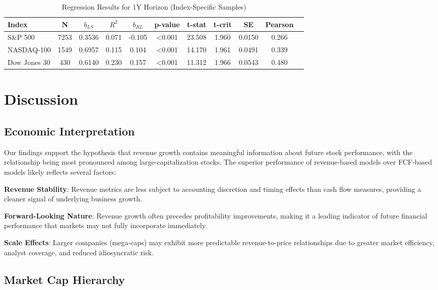 \documentclass[11pt]{article}
\begin{document}
\begin{table*}[h]
\centering
\caption{Regression Results for 1Y Horizon (Index-Specific Samples)}
\label{tab:regression-1y-index}
\small
\begin{tabular}{lcccccccccc}
\toprule
Index & N & $b_{LS}$ & $R^2$ & $b_{RL}$ & p-value & t-stat & t-crit & SE & Pearson \\
\midrule
S\&P 500     & 7253 & 0.3536 & 0.071 & -0.105 & <0.001 & 23.508 & 1.960 & 0.0150 & 0.266 \\
NASDAQ-100   & 1549 & 0.6957 & 0.115 &  0.104 & <0.001  & 14.170 & 1.961 & 0.0491 & 0.339 \\
Dow Jones 30 &  430 & 0.6140 & 0.230 &  0.157 & <0.001 & 11.312 & 1.966 & 0.0543 & 0.480 \\
\bottomrule
\end{tabular}
\end{table*}


\section{Discussion}

\subsection{Economic Interpretation}

Our findings support the hypothesis that revenue growth contains meaningful information about future stock performance, with the relationship being most pronounced among large-capitalization stocks. The superior performance of revenue-based models over FCF-based models likely reflects several factors:

\textbf{Revenue Stability}: Revenue metrics are less subject to accounting discretion and timing effects than cash flow measures, providing a cleaner signal of underlying business growth.

\textbf{Forward-Looking Nature}: Revenue growth often precedes profitability improvements, making it a leading indicator of future financial performance that markets may not fully incorporate immediately.

\textbf{Scale Effects}: Larger companies (mega-caps) may exhibit more predictable revenue-to-price relationships due to greater market efficiency, analyst coverage, and reduced idiosyncratic risk.

\subsection{Market Cap Hierarchy}
\end{document}
